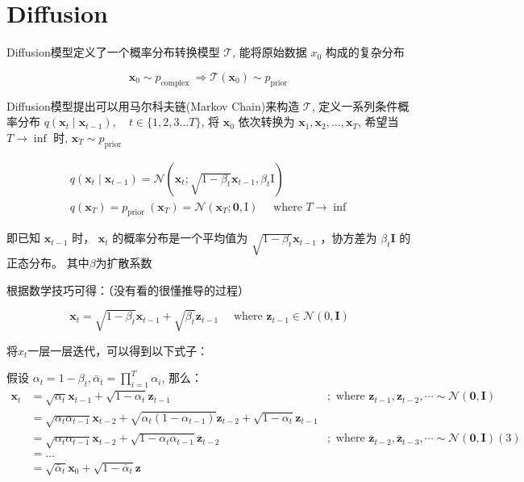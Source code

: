 \documentclass[]{ctexart}
\begin{document}
\section{Diffusion}

Diffusion模型定义了一个概率分布转换模型 $\mathcal{T}$, 能将原始数据 $x_0$ 构成的复杂分布

$$
\mathbf{x}_0 \sim p_{\text {complex }} \Longrightarrow \mathcal{T}\left(\mathbf{x}_0\right) \sim p_{\text {prior }}
$$

Diffusion模型提出可以用马尔科夫链(Markov Chain)来构造 $\mathcal{T}$, 定义一系列条件概率分布 $q\left(\mathbf{x}_t \mid \mathbf{x}_{t-1}\right), \quad t \in\{1,2,3 \ldots T\}$, 
将 $\mathbf{x}_0$ 依次转换为 $\mathbf{x}_1, \mathbf{x}_2, \ldots, \mathbf{x}_T$, 希望当 $T \rightarrow \inf$ 时, $\mathbf{x}_T \sim p_{\text {prior }}$

$$
\begin{gathered}
q\left(\mathbf{x}_t \mid \mathbf{x}_{t-1}\right)=\mathcal{N}\left(\mathbf{x}_t ; \sqrt{1-\beta_t} \mathbf{x}_{t-1}, \beta_t \mathrm{I}\right) \\
q\left(\mathbf{x}_T\right)=p_{\text {prior }}\left(\mathbf{x}_T\right)=\mathcal{N}\left(\mathbf{x}_T ; \mathbf{0}, \mathrm{I}\right) \quad \text { where } T \rightarrow \inf
\end{gathered}
$$

即已知 $\mathbf{x}_{t-1}$ 时， $\mathbf{x}_t$ 的概率分布是一个平均值为 $\sqrt{1-\beta_t} \mathbf{x}_{t-1}$ ，协方差为 $\beta_t \mathbf{I}$ 的正态分布。
其中$\beta$为扩散系数

根据数学技巧可得：（没有看的很懂推导的过程）

$$
\mathbf{x}_t=\sqrt{1-\beta_t} \mathbf{x}_{t-1}+\sqrt{\beta_t} \mathbf{z}_{t-1} \quad \text { where } \mathbf{z}_{t-1} \in \mathcal{N}(0, \mathbf{I})
$$

将$x_t$一层一层迭代，可以得到以下式子：

假设 $\alpha_t=1-\beta_t, \bar{\alpha}_t=\prod_{i=1}^T \alpha_i$, 那么：
$$
\begin{array}{rlr}
\mathbf{x}_t & =\sqrt{\alpha_t} \mathbf{x}_{t-1}+\sqrt{1-\alpha_t} \mathbf{z}_{t-1} & ; \text { where } \mathbf{z}_{t-1}, \mathbf{z}_{t-2}, \cdots \sim \mathcal{N}(\mathbf{0}, \mathbf{I}) \\
& =\sqrt{\alpha_t \alpha_{t-1}} \mathbf{x}_{t-2}+\sqrt{\alpha_t\left(1-\alpha_{t-1}\right)} \mathbf{z}_{t-2}+\sqrt{1-\alpha_t} \mathbf{z}_{t-1} & \\
& =\sqrt{\alpha_t \alpha_{t-1}} \mathbf{x}_{t-2}+\sqrt{1-\alpha_t \alpha_{t-1}} \overline{\mathbf{z}}_{t-2} & ; \text { where } \overline{\mathbf{z}}_{t-2}, \overline{\mathbf{z}}_{t-3}, \cdots \sim \mathcal{N}(\mathbf{0}, \mathbf{I})(3) \\
& =\ldots & \\
& =\sqrt{\bar{\alpha}_t} \mathbf{x}_0+\sqrt{1-\bar{\alpha}_t} \mathbf{z} &
\end{array}
$$
\end{document}
